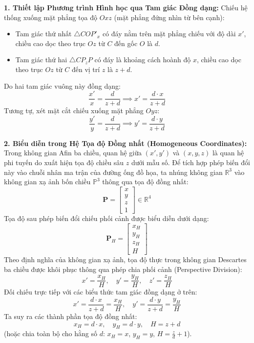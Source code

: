 \textbf{1. Thiết lập Phương trình Hình học qua Tam giác Đồng dạng:}
Chiếu hệ thống xuống mặt phẳng tọa độ $Oxz$ (mặt phẳng đứng nhìn từ bên cạnh):
\begin{itemize}
    \item Tam giác thứ nhất $\triangle C O P'_x$ có đáy nằm trên mặt phẳng chiếu với độ dài $x'$, chiều cao dọc theo trục $Oz$ từ $C$ đến gốc $O$ là $d$.
    \item Tam giác thứ hai $\triangle C P_z P$ có đáy là khoảng cách hoành độ $x$, chiều cao dọc theo trục $Oz$ từ $C$ đến vị trí $z$ là $z + d$.
\end{itemize}
Do hai tam giác vuông này đồng dạng:
\begin{equation}
\frac{x'}{x} = \frac{d}{z + d} \implies x' = \frac{d \cdot x}{z + d}
\end{equation}
Tương tự, xét mặt cắt chiếu xuống mặt phẳng $Oyz$:
\begin{equation}
\frac{y'}{y} = \frac{d}{z + d} \implies y' = \frac{d \cdot y}{z + d}
\end{equation}

\textbf{2. Biểu diễn trong Hệ Tọa độ Đồng nhất (Homogeneous Coordinates):}
Trong không gian Afin ba chiều, quan hệ giữa $(x', y')$ và $(x, y, z)$ là quan hệ phi tuyến do xuất hiện tọa độ chiều sâu $z$ dưới mẫu số. Để tích hợp phép biến đổi này vào chuỗi nhân ma trận của đường ống đồ họa, ta nhúng không gian $\mathbb{R}^3$ vào không gian xạ ảnh bốn chiều $\mathbb{P}^3$ thông qua tọa độ đồng nhất:
\begin{equation}
\mathbf{P} = \begin{bmatrix} x \\ y \\ z \\ 1 \end{bmatrix} \in \mathbb{R}^4
\end{equation}
Tọa độ sau phép biến đổi chiếu phối cảnh được biểu diễn dưới dạng:
\begin{equation}
\mathbf{P}_H = \begin{bmatrix} x_H \\ y_H \\ z_H \\ H \end{bmatrix}
\end{equation}
Theo định nghĩa của không gian xạ ảnh, tọa độ thực trong không gian Descartes ba chiều được khôi phục thông qua phép chia phối cảnh (Perspective Division):
\begin{equation}
\label{eq:perspective_division_rules}
x' = \frac{x_H}{H}, \quad y' = \frac{y_H}{H}, \quad z' = \frac{z_H}{H}
\end{equation}
Đối chiếu trực tiếp với các biểu thức tam giác đồng dạng ở trên:
\begin{equation}
x' = \frac{d \cdot x}{z + d} = \frac{x_H}{H}, \quad y' = \frac{d \cdot y}{z + d} = \frac{y_H}{H}
\end{equation}
Ta suy ra các thành phần tọa độ đồng nhất:
\begin{equation}
\label{eq:homogeneous_assignment}
x_H = d \cdot x, \quad y_H = d \cdot y, \quad H = z + d
\end{equation}
(hoặc chia toàn bộ cho hằng số $d$: $x_H = x$, $y_H = y$, $H = \frac{z}{d} + 1$).

